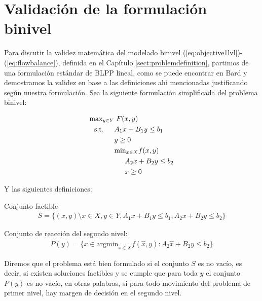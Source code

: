 \chapter{Validación de la formulación binivel}
\label{sect:apendixbilevelvalidation}

Para discutir la validez matemática del modelado binivel (\ref{eq:objective1lvl})-(\ref{eq:flowbalance}), definida en el Capítulo \ref{sect:problemdefinition}, partimos de una formulación estándar de BLPP lineal, como se puede encontrar en Bard \cite{bardbook} y demostramos la validez en base a las definiciones ahi mencionadas justificando según nuestra formulación. Sea la siguiente formulación simplificada del problema binivel:

\begin{align}
\text{max}_{y \in Y}    & \; F(x, y) \label{bilevelgeneric1} \\
\text{s.t.} \hspace{1.5em} & A_1 x + B_1 y \leq b_1 \\
                        & y \geq 0 \\
                        & \text{min}_{x \in X} f(x, y) \\
                        & \hspace{1.5em} A_2 x + B_2 y \leq b_2 \label{bilevelgeneric5} \\
                        & \hspace{1.5em} x \geq 0 \label{bilevelgeneric6}
\end{align}

Y las siguientes definiciones:

\begin{definition}
Conjunto factible
\begin{align}
  S = \{(x, y) \setminus x \in X, y \in Y, A_1 x + B_1 y \leq b_1, A_2 x + B_2 y \leq b_2 \}
\end{align}
\end{definition}

\begin{definition}
Conjunto de reacción del segundo nivel:
\begin{align}
  P(y) = \{ x \in \text{argmin}_{\hat{x} \in X} f(\hat{x}, y) : A_2 \hat{x} + B_2 y \leq b_2 \}
\end{align}
\end{definition}

Diremos que el problema está bien formulado si el conjunto $S$ es no vacío, es decir, si existen soluciones factibles y se cumple que para toda $y$ el conjunto $P(y)$ es no vacío, en otras palabras, si para todo movimiento del problema de primer nivel, hay margen de decisión en el segundo nivel.

